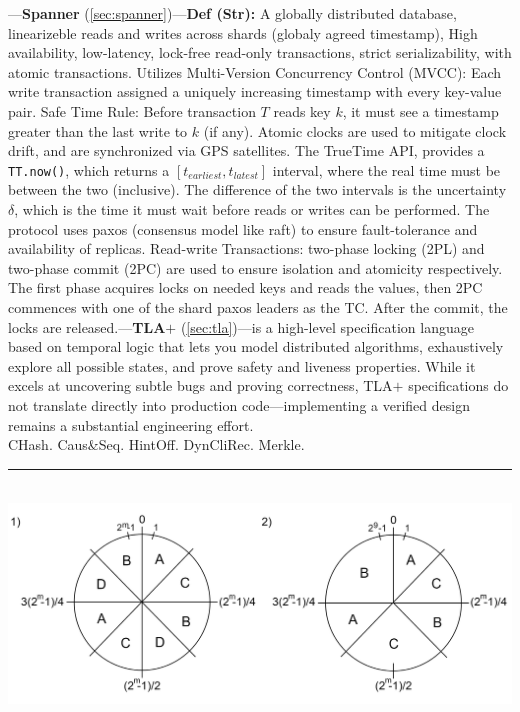 \begin{multicols}{2}

\noindent
---\textbf{Spanner} (\ref{sec:spanner})---\textbf{Def (Str):} A globally distributed database, linearizeble reads and writes across shards (globaly agreed timestamp), High availability, low-latency, lock-free read-only transactions, strict serializability, with atomic transactions.
Utilizes Multi-Version Concurrency Control (MVCC): Each write transaction assigned a uniquely increasing timestamp with every key-value pair.
Safe Time Rule: Before transaction $T$ reads key $k$, it must see a timestamp greater than the last write to $k$ (if any).
Atomic clocks are used to mitigate clock drift, and are synchronized via GPS satellites. The TrueTime API, provides a \texttt{TT.now()}, which returns  a $[t_{earliest}, t_{latest}]$ interval, where the real time must be between the two (inclusive).
The difference of the two intervals is the uncertainty $\delta$, which is the time it must wait before reads or writes can be performed.
The protocol uses paxos (consensus model like raft) to ensure fault-tolerance and availability of replicas. Read-write Transactions:
two-phase locking (2PL) and two-phase commit (2PC) are used to ensure isolation and atomicity respectively. The first phase acquires locks on needed keys and reads the values, then 2PC commences with one of the shard paxos leaders as the TC.
After the commit, the locks are released.---\textbf{TLA$+$} (\ref{sec:tla})---is a high-level specification language based on temporal logic that lets you model distributed
algorithms, exhaustively explore all possible states, and prove safety and liveness properties. While
it excels at uncovering subtle bugs and proving correctness, TLA$+$ specifications do not translate
directly into production code—implementing a verified design remains a substantial engineering
effort.\\
CHash. Caus\&Seq. HintOff. DynCliRec. Merkle.

\noindent
\rule{\linewidth}{0.4pt}\\
\includegraphics[width=\linewidth]{Sections/shard/ring_2.png}\\


\end{multicols}
